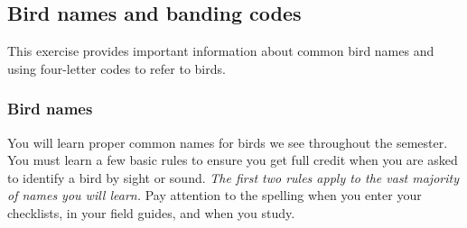 \documentclass[11pt]{article}
\begin{document}
\thispagestyle{plain}

\subsection*{Bird names and banding codes}

This exercise provides important information about common bird names and using four-letter codes to refer to birds.

\subsubsection*{Bird names}

You will learn proper common names for birds we see throughout the semester. You must learn a few basic rules to ensure you get full credit when you are asked to identify a bird by sight or sound.  \emph{The first two rules apply to the vast majority of names you will learn.} Pay attention to the spelling when you enter your checklists, in your field guides, and when you study.
\end{document}
